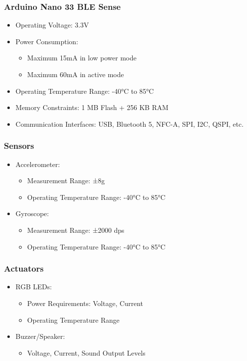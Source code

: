 \subsubsection{Arduino Nano 33 BLE Sense}
\begin{itemize}[label=--]
	\item Operating Voltage: 3.3V
	\item Power Consumption:
	\begin{itemize}[label=--,leftmargin=*]
		\item Maximum 15mA in low power mode
		\item Maximum 60mA in active mode
	\end{itemize}
	\item Operating Temperature Range: -40°C to 85°C
	\item Memory Constraints: 1 MB Flash + 256 KB RAM
	\item Communication Interfaces: USB, Bluetooth 5, NFC-A, SPI, I2C, QSPI, etc.\cite{Arduino:2015}
\end{itemize}

\subsubsection*{Sensors}
\begin{itemize}[label=--]
	\item Accelerometer:
	\begin{itemize}[label=--,leftmargin=*]
		\item Measurement Range: ±8g
		\item Operating Temperature Range: -40°C to 85°C
	\end{itemize}
	\item Gyroscope:
	\begin{itemize}[label=--,leftmargin=*]
		\item Measurement Range: ±2000 dps
		\item Operating Temperature Range: -40°C to 85°C \cite{Arduino:2021}
	\end{itemize}
	
\end{itemize}


\subsubsection*{Actuators}
\begin{itemize}[label=--]
	\item RGB LEDs:
	\begin{itemize}[label=--,leftmargin=*]
		\item Power Requirements: Voltage, Current
		\item Operating Temperature Range
	\end{itemize}
	\item Buzzer/Speaker:
	\begin{itemize}[label=--,leftmargin=*]
		\item  Voltage, Current, Sound Output Levels
	\end{itemize}
	
\end{itemize}

